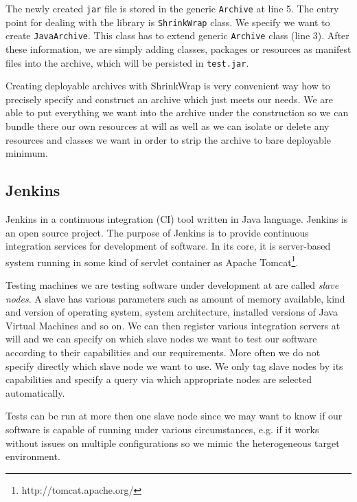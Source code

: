 \documentclass[12pt,final,oneside]{fithesis}
\begin{document}


The newly created \texttt{jar} file is stored in the generic \texttt{Archive} at line 5. The entry point for dealing with the library is \texttt{ShrinkWrap} class. We specify we want to create \texttt{JavaArchive}. This class has to extend generic \texttt{Archive} class (line 3). After these information, we are simply adding classes, packages or resources as manifest files into the archive, which will be persisted in \texttt{test.jar}.

Creating deployable archives with ShrinkWrap is very convenient way how to precisely specify and construct an archive which just meets our needs. We are able to put everything we want into the archive under the construction so we can bundle there our own resources at will as well as we can isolate or delete any resources and classes we want in order to strip the archive to bare deployable minimum.

		\subsection{Jenkins}

Jenkins\cite{bib040} in a continuous integration (CI) tool written in Java language. Jenkins is an open source project. The purpose of Jenkins is to provide continuous integration services for development of software. In its core, it is server-based system running in some kind of servlet container as Apache Tomcat\footnote{http://tomcat.apache.org/}.

Testing machines we are testing software under development at are called \textit{slave nodes}\cite{bib042}. A slave has various parameters such as amount of memory available, kind and version of operating system, system architecture, installed versions of Java Virtual Machines\cite{bib041} and so on. We can then register various integration servers at will and we can specify on which slave nodes we want to test our software according to their capabilities and our requirements. More often we do not specify directly which slave node we want to use. We only tag slave nodes by its capabilities and specify a query via which appropriate nodes are selected automatically.

Tests can be run at more then one slave node since we may want to know if our software is capable of running under various circumstances, e.g. if it works without issues on multiple configurations so we mimic the heterogeneous target environment.
\end{document}

